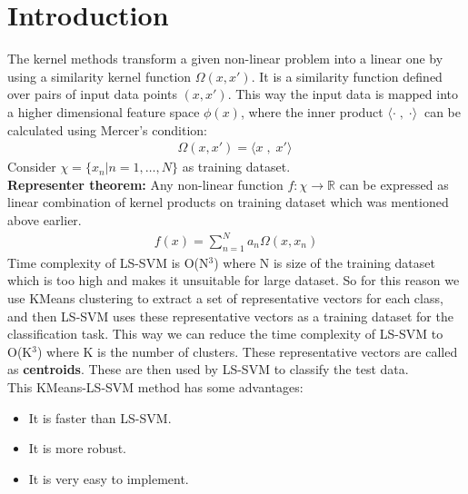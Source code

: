 \documentclass[conference]{IEEEtran}
\begin{document}
    \section{Introduction}
    The kernel methods transform a given non-linear problem into a linear one by using a similarity kernel function $\Omega(x,x\prime)$. It is a similarity function defined over pairs of input data points $(x, x\prime)$. This way the input data is mapped into a higher dimensional feature space  $\phi(x)$, where the inner product $ \langle\cdot\;,\;\cdot\rangle\ $ can be calculated using Mercer's condition:
    \begin{align}
        \Omega(x,x\prime) = \langle x \;,\; x\prime\rangle\
    \end{align}
    Consider $\chi = \{x_{n} | n=1,\ldots,N\}$ as training dataset. \\
    \textbf{Representer theorem:} Any non-linear function $f : \chi \longrightarrow \mathbb{R}$ can be expressed as linear combination of kernel products on training dataset which was mentioned above earlier.
    \begin{align}
        f(x) = \sum_{n=1}^{N} a_{n}\Omega(x,x_{n})
    \end{align}
    Time complexity of LS-SVM is O(N$^3$) where N is size of the training dataset which is too high and makes it unsuitable for large dataset.
    So for this reason we use KMeans clustering to extract a set of representative vectors for each class, and then LS-SVM uses these representative vectors as a training dataset for the classification task. This way we can reduce the time complexity of LS-SVM to O(K$^3$) where K is the number of clusters.
    These representative vectors are called as \textbf{centroids}. These are then used by LS-SVM to classify the test data. \\
    This KMeans-LS-SVM method has some advantages:
    \begin{itemize}
        \item It is faster than LS-SVM.
        \item It is more robust.
        \item It is very easy to implement.
    \end{itemize}
\end{document}
